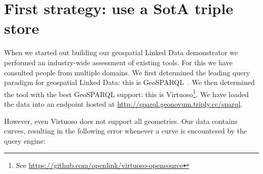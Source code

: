 \documentclass[a4paper]{scrartcl}
\begin{document}

\section{First strategy: use a SotA triple store}

When we started out building our geospatial Linked Data demonstrator
we performed an industry-wide assessment of existing tools.  For this
we have consulted people from multiple domains.  We first determined
the leading query paradigm for geospatial Linked Data: this is
GeoSPARQL~\cite{Battle2011}.  We then determined the tool with the
best GeoSPARQL support: this is Virtuoso\footnote{See
  \url{https://github.com/openlink/virtuoso-opensource}}.  We have
loaded the data into an endpoint hosted at
\url{http://sparql.geonovum.triply.cc/sparql}.

However, even Virtuoso does not support all geometries.  Our data
contains curves, resulting in the following error whenever a curve is
encountered by the query engine:
\end{document}
